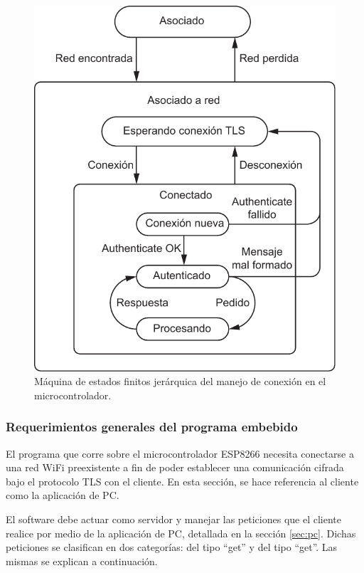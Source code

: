 \begin{figure}[ht!]
	\begin{center}
		\centering
		\includegraphics[scale=0.8]{imagenes/fsm-micro.pdf}
		\caption{Máquina de estados finitos jerárquica del manejo de conexión en el microcontrolador.}
		\label{fig:fsm-micro}
	\end{center}
\end{figure}



\subsubsection{Requerimientos generales del programa embebido}

El programa que corre sobre el microcontrolador ESP8266 necesita conectarse a una red WiFi preexistente a fin de poder establecer una comunicación cifrada bajo el protocolo TLS con el cliente.
En esta sección, se hace referencia al cliente como la aplicación de PC.

El software debe actuar como servidor y manejar las peticiones que el cliente realice por medio de la aplicación de PC, detallada en la sección \ref{sec:pc}.
Dichas peticiones se clasifican en dos categorías: del tipo \enquote{get} y del tipo \enquote{get}. Las mismas se explican a continuación.

